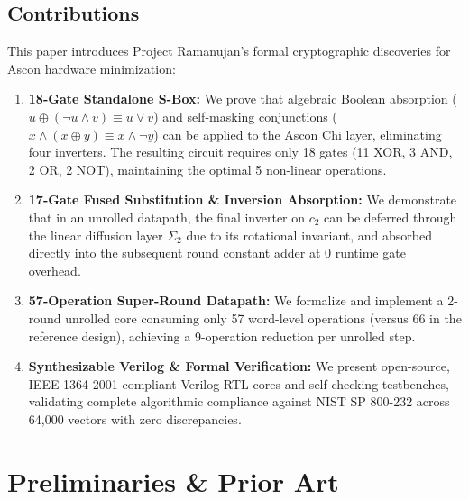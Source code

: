 \documentclass[journal,10pt]{IEEEtran}
\begin{document}
\subsection{Contributions}
This paper introduces Project Ramanujan's formal cryptographic discoveries for Ascon hardware minimization:
\begin{enumerate}
    \item \textbf{18-Gate Standalone S-Box:} We prove that algebraic Boolean absorption ($u \oplus (\neg u \land v) \equiv u \lor v$) and self-masking conjunctions ($x \land (x \oplus y) \equiv x \land \neg y$) can be applied to the Ascon Chi layer, eliminating four inverters. The resulting circuit requires only 18 gates (11 XOR, 3 AND, 2 OR, 2 NOT), maintaining the optimal 5 non-linear operations.
    \item \textbf{17-Gate Fused Substitution \& Inversion Absorption:} We demonstrate that in an unrolled datapath, the final inverter on $c_2$ can be deferred through the linear diffusion layer $\Sigma_2$ due to its rotational invariant, and absorbed directly into the subsequent round constant adder at 0 runtime gate overhead.
    \item \textbf{57-Operation Super-Round Datapath:} We formalize and implement a 2-round unrolled core consuming only 57 word-level operations (versus 66 in the reference design), achieving a 9-operation reduction per unrolled step.
    \item \textbf{Synthesizable Verilog \& Formal Verification:} We present open-source, IEEE 1364-2001 compliant Verilog RTL cores and self-checking testbenches, validating complete algorithmic compliance against NIST SP 800-232 across 64,000 vectors with zero discrepancies.
\end{enumerate}

\section{Preliminaries \& Prior Art}
\end{document}
